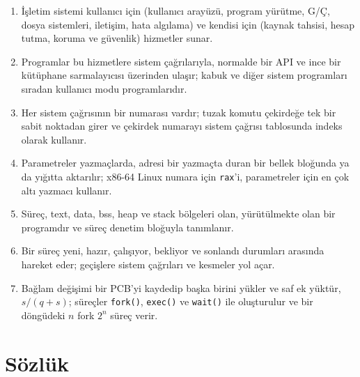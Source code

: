\documentclass[11pt,a4paper]{article}
\newcommand{\cmd}[1]{\texttt{#1}}
\begin{document}
\begin{keyidea}
\begin{enumerate}[leftmargin=1.4em]
  \item İşletim sistemi kullanıcı için (kullanıcı arayüzü, program yürütme, G/Ç, dosya sistemleri, iletişim, hata algılama) ve kendisi için (kaynak tahsisi, hesap tutma, koruma ve güvenlik) hizmetler sunar.
  \item Programlar bu hizmetlere sistem çağrılarıyla, normalde bir API ve ince bir kütüphane sarmalayıcısı üzerinden ulaşır; kabuk ve diğer sistem programları sıradan kullanıcı modu programlarıdır.
  \item Her sistem çağrısının bir numarası vardır; tuzak komutu çekirdeğe tek bir sabit noktadan girer ve çekirdek numarayı sistem çağrısı tablosunda indeks olarak kullanır.
  \item Parametreler yazmaçlarda, adresi bir yazmaçta duran bir bellek bloğunda ya da yığıtta aktarılır; x86-64 Linux numara için \texttt{rax}'i, parametreler için en çok altı yazmacı kullanır.
  \item Süreç, text, data, bss, heap ve stack bölgeleri olan, yürütülmekte olan bir programdır ve süreç denetim bloğuyla tanımlanır.
  \item Bir süreç yeni, hazır, çalışıyor, bekliyor ve sonlandı durumları arasında hareket eder; geçişlere sistem çağrıları ve kesmeler yol açar.
  \item Bağlam değişimi bir PCB'yi kaydedip başka birini yükler ve saf ek yüktür, $s/(q+s)$; süreçler \cmd{fork()}, \cmd{exec()} ve \cmd{wait()} ile oluşturulur ve bir döngüdeki $n$ fork $2^{n}$ süreç verir.
\end{enumerate}
\end{keyidea}

\section{Sözlük}
\end{document}
